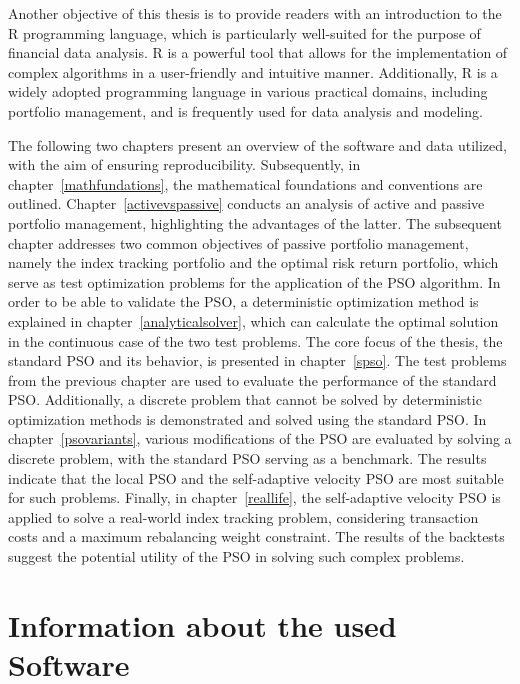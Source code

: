 \documentclass[
  oneside, a4paper, 12pt, openany]{book}
\theoremstyle{definition}
\theoremstyle{definition}
\theoremstyle{definition}
\theoremstyle{definition}
\theoremstyle{remark}
\begin{document}
Another objective of this thesis is to provide readers with an introduction to the R programming language, which is particularly well-suited for the purpose of financial data analysis. R is a powerful tool that allows for the implementation of complex algorithms in a user-friendly and intuitive manner. Additionally, R is a widely adopted programming language in various practical domains, including portfolio management, and is frequently used for data analysis and modeling.

The following two chapters present an overview of the software and data utilized, with the aim of ensuring reproducibility. Subsequently, in chapter~\ref{mathfundations}, the mathematical foundations and conventions are outlined. Chapter~\ref{activevspassive} conducts an analysis of active and passive portfolio management, highlighting the advantages of the latter. The subsequent chapter addresses two common objectives of passive portfolio management, namely the index tracking portfolio and the optimal risk return portfolio, which serve as test optimization problems for the application of the PSO algorithm. In order to be able to validate the PSO, a deterministic optimization method is explained in chapter~\ref{analyticalsolver}, which can calculate the optimal solution in the continuous case of the two test problems. The core focus of the thesis, the standard PSO and its behavior, is presented in chapter~\ref{spso}. The test problems from the previous chapter are used to evaluate the performance of the standard PSO. Additionally, a discrete problem that cannot be solved by deterministic optimization methods is demonstrated and solved using the standard PSO. In chapter~\ref{psovariants}, various modifications of the PSO are evaluated by solving a discrete problem, with the standard PSO serving as a benchmark. The results indicate that the local PSO and the self-adaptive velocity PSO are most suitable for such problems. Finally, in chapter~\ref{reallife}, the self-adaptive velocity PSO is applied to solve a real-world index tracking problem, considering transaction costs and a maximum rebalancing weight constraint. The results of the backtests suggest the potential utility of the PSO in solving such complex problems.

\hypertarget{information-about-the-used-software}{%
\chapter{Information about the used Software}\label{information-about-the-used-software}}
\end{document}
